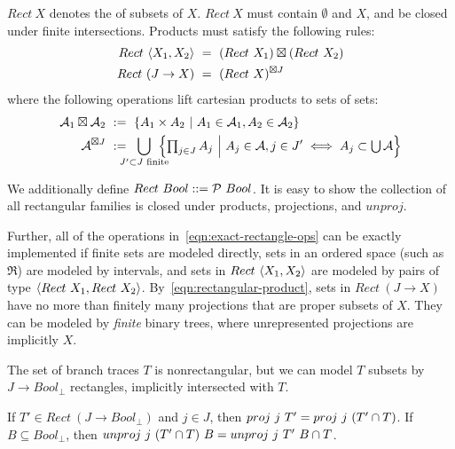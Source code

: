\documentclass{llncs}
\begin{document}
\begin{definition}
\label{def:standard-rectangle}
$Rect~X$ denotes the  of subsets of $X$.
$Rect~X$ must contain $\emptyset$ and $X$, and be closed under finite intersections.
Products must satisfy the following rules:
\begin{align}
	Rect~\langle{X_1,X_2}\rangle &\ = \ (Rect~X_1) \boxtimes (Rect~X_2)
	\label{eqn:standard-rect-finite-product-rule}
\\
	Rect~(J \to X) &\ = \ (Rect~X)^{\boxtimes J}
	\label{eqn:standard-rect-arbitrary-product-rule}
\end{align}
where the following operations lift cartesian products to sets of sets:
\begin{align}
	\A_1 \boxtimes \A_2 &\ := \ \setb{A_1 \times A_2}{A_1 \in \A_1, A_2 \in \A_2}
\\
	\A^{\boxtimes J} &\ := \ \!\!\!\!\!\!\!\displaystyle\bigcup_{J' \subset J \text{ finite}}\!\!\!\!\!\! \left\{\textstyle\prod_{j \in J} A_j\ \middle|\ A_j \in \A, j \in J' \iff A_j \subset \U\A\right\}
\label{eqn:rectangular-product}
\end{align}
\end{definition}

We additionally define $Rect~Bool ::= \mathcal{P}~Bool$.
It is easy to show the collection of all rectangular families is closed under products, projections, and $unproj$.

Further, all of the operations in~\eqref{eqn:exact-rectangle-ops} can be exactly implemented if finite sets are modeled directly, sets in an ordered space (such as $\Re$) are modeled by intervals, and sets in $Rect~\langle{X_1,X_2}\rangle$ are modeled by pairs of type $\langle{Rect~X_1,Rect~X_2}\rangle$.
By~\eqref{eqn:rectangular-product}, sets in $Rect~(J \to X)$ have no more than finitely many projections that are proper subsets of $X$.
They can be modeled by \emph{finite} binary trees, where unrepresented projections are implicitly $X$.

The set of branch traces $T$ is nonrectangular, but we can model $T$ subsets by $J \to Bool_\bot$ rectangles, implicitly intersected with $T$.

\begin{theorem}[$T$ model]
If $T' \in Rect~(J \to Bool_\bot)$ and $j \in J$, then $proj~j~T' = proj~j~(T' \cap T)$.
If $B \subseteq Bool_\bot$, then $unproj~j~(T' \cap T)~B = unproj~j~T'~B \cap T$.
\end{theorem}
\end{document}
